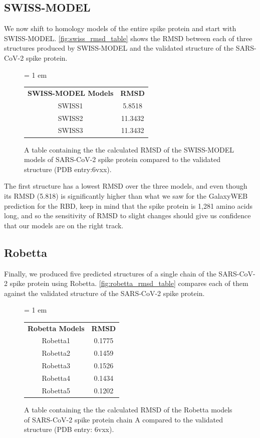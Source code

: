 \FloatBarrier
{}
\subsection{SWISS-MODEL}

We now shift to homology models of the entire spike protein and start with SWISS-MODEL. \autoref{fig:swiss_rmsd_table} shows the RMSD between each of three structures produced by SWISS-MODEL and the validated structure of the SARS-CoV-2 spike protein.\\

\begin{figure}[h]
	\centering
	\tabcolsep = 1 em
	\mySfFamily
	\begin{tabular}{c c}
		\textbf{SWISS-MODEL Models} & \textbf{RMSD} \\
		SWISS1 & 5.8518 \\
		SWISS2 & 11.3432 \\
		SWISS3 & 11.3432 \\
	\end{tabular}
	\caption{A table containing the the calculated RMSD of the SWISS-MODEL models of SARS-CoV-2 spike protein compared to the validated structure (PDB entry:6vxx).}
	\label{fig:swiss_rmsd_table}
\end{figure}

The first structure has a lowest RMSD over the three models, and even though its RMSD (5.818) is significantly higher than what we saw for the GalaxyWEB prediction for the RBD, keep in mind that the spike protein is 1,281 amino acids long, and so the sensitivity of RMSD to slight changes should give us confidence that our models are on the right track.

\FloatBarrier
{}
\subsection{Robetta}

Finally, we produced five predicted structures of a single chain of the SARS-CoV-2 spike protein using Robetta. \autoref{fig:robetta_rmsd_table} compares each of them against the validated structure of the SARS-CoV-2 spike protein.\\

\begin{figure}[h]
	\centering
	\tabcolsep = 1 em
	\mySfFamily
	\begin{tabular}{c c}
		\textbf{Robetta Models} & \textbf{RMSD} \\
		Robetta1 & 0.1775 \\
		Robetta2 & 0.1459 \\
		Robetta3 & 0.1526 \\
		Robetta4 & 0.1434 \\
		Robetta5 & 0.1202 \\
	\end{tabular}
	\caption{A table containing the the calculated RMSD of the Robetta models of SARS-CoV-2 spike protein chain A compared to the validated structure (PDB entry: 6vxx).}
	\label{fig:robetta_rmsd_table}
\end{figure}

